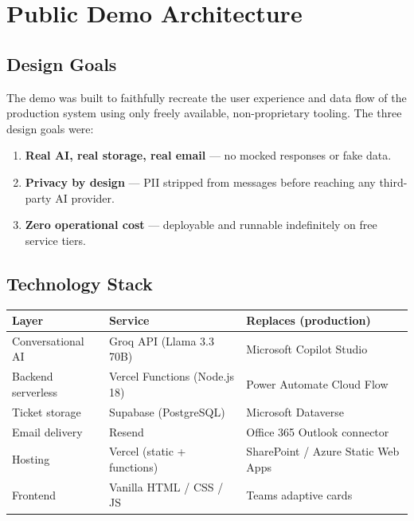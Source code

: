 \documentclass[12pt, a4paper]{article}
\begin{document}
\section{Public Demo Architecture}

\subsection{Design Goals}

The demo was built to faithfully recreate the user experience and data flow of the
production system using only freely available, non-proprietary tooling. The three
design goals were:

\begin{enumerate}[leftmargin=*, label=\arabic*.]
  \item \textbf{Real AI, real storage, real email} — no mocked responses or fake data.
  \item \textbf{Privacy by design} --- PII stripped from messages before reaching any
        third-party AI provider.
  \item \textbf{Zero operational cost} --- deployable and runnable indefinitely on free
        service tiers.
\end{enumerate}

\subsection{Technology Stack}

\begin{center}
\begin{tabular}{lll}
\toprule
\textbf{Layer} & \textbf{Service} & \textbf{Replaces (production)} \\
\midrule
Conversational AI & Groq API (Llama 3.3 70B) & Microsoft Copilot Studio \\
Backend serverless & Vercel Functions (Node.js 18) & Power Automate Cloud Flow \\
Ticket storage & Supabase (PostgreSQL) & Microsoft Dataverse \\
Email delivery & Resend & Office 365 Outlook connector \\
Hosting & Vercel (static + functions) & SharePoint / Azure Static Web Apps \\
Frontend & Vanilla HTML / CSS / JS & Teams adaptive cards \\
\bottomrule
\end{tabular}
\end{center}
\end{document}
